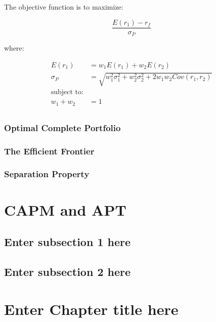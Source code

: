 \documentclass[
]{book}
\begin{document}
The objective function is to maximize:

\[\frac{{E(r_1) - r_f}}{{\sigma_P}}\]

where:

\[
\begin{aligned} 
E(r_1)    &= w_1 E(r_1) + w_2 E(r_2)\\
\sigma_P  &= \sqrt{{w_1^2 \sigma_1^2 + w_2^2 \sigma_2^2 + 2w_1 w_2 Cov(r_1, r_2)}}\\
\text{subject to}:\\
w_1 + w_2 &= 1\\
\end{aligned} 
\]

\hypertarget{optimal-complete-portfolio}{%
\subsection{Optimal Complete Portfolio}\label{optimal-complete-portfolio}}

\hypertarget{the-efficient-frontier}{%
\subsection{The Efficient Frontier}\label{the-efficient-frontier}}

\hypertarget{separation-property}{%
\subsection{Separation Property}\label{separation-property}}

\hypertarget{ch4}{%
\chapter{CAPM and APT}\label{ch4}}

\hypertarget{enter-subsection-1-here}{%
\section{Enter subsection 1 here}\label{enter-subsection-1-here}}

\hypertarget{enter-subsection-2-here}{%
\section{Enter subsection 2 here}\label{enter-subsection-2-here}}

\hypertarget{ch5}{%
\chapter{Enter Chapter title here}\label{ch5}}
\end{document}
